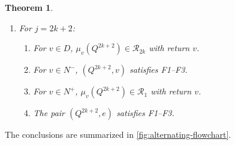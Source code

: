 \documentclass[10pt,a4paper]{amsart}
\newtheorem{theorem}{Theorem}[section]
\theoremstyle{definition}
\theoremstyle{definition}
\numberwithin{equation}{section}
\numberwithin{table}{section}
\newcommand{\nminus}{N^{-}}
\newcommand{\nplus}{N^{+}}
\newcommand{\Rclass}{\mathcal{R}}
\newcommand{\Qalt}[1]{Q^{#1}}
\begin{document}
\begin{theorem}
\begin{enumerate}[label=\textup{(\roman*)},leftmargin=2.35em,itemsep=1pt,topsep=1pt]
\item For $j=2k+2$:
\begin{enumerate}[label=\textup{(\alph*)},leftmargin=2.15em,itemsep=0pt,topsep=0pt]
\item For $v\in D$,
$\mu_v(\Qalt{2k+2})\in\Rclass_{2k}$ with return $v$.
\item For $v\in\nminus$, $(\Qalt{2k+2},v)$ satisfies F1--F3.
\item For $v\in\nplus$, $\mu_v(\Qalt{2k+2})\in\Rclass_1$ with
return $v$.
\item The pair $(\Qalt{2k+2},e)$ satisfies F1--F3.
\end{enumerate}
\end{enumerate}
\end{theorem}

The conclusions are summarized in \cref{fig:alternating-flowchart}.
\end{document}
